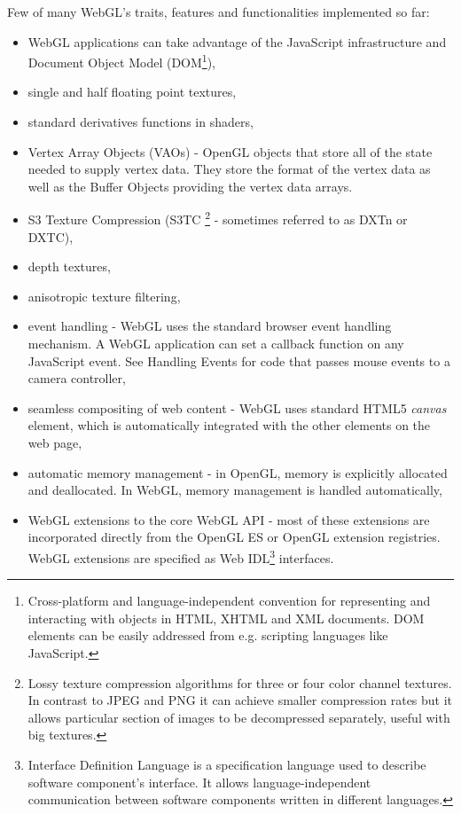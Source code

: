Few of many WebGL's traits, features and functionalities implemented so far:
\begin{itemize}
\item WebGL applications can take advantage of the JavaScript infrastructure and Document Object Model (DOM\footnote{Cross-platform and language-independent convention for representing and interacting with objects in HTML, XHTML and XML documents. DOM elements can be easily addressed from e.g. scripting languages like JavaScript.}),
\item single and half floating point textures,
\item standard derivatives functions in shaders,
\item Vertex Array Objects (VAOs) - OpenGL objects that store all of the state needed to supply vertex data. They store the format of the vertex data as well as the Buffer Objects providing the vertex data arrays.
\item S3 Texture Compression (S3TC \footnote{Lossy texture compression algorithms for three or four color channel textures. In contrast to JPEG and PNG it can achieve smaller compression rates but it allows particular section of images to be decompressed separately, useful with big textures.} - sometimes referred to as DXTn or DXTC),
\item depth textures,
\item anisotropic texture filtering,
\item event handling - WebGL uses the standard browser event handling mechanism. A WebGL application can set a callback function on any JavaScript event. See Handling Events for code that passes mouse events to a camera controller,
\item seamless compositing of web content - WebGL uses standard HTML5 \emph{canvas} element, which is automatically integrated with the other elements on the web page,
\item automatic memory management - in OpenGL, memory is explicitly allocated and deallocated. In WebGL, memory management is handled automatically,
\item WebGL extensions to the core WebGL API - most of these extensions are incorporated directly from the OpenGL ES or OpenGL extension registries.
WebGL extensions are specified as Web IDL\footnote{Interface Definition Language is a specification language used to describe software component's interface. It allows language-independent communication between software components written in different languages.} interfaces.
\end{itemize}